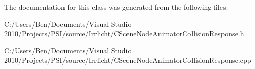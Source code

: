 The documentation for this class was generated from the following files\-:\begin{DoxyCompactItemize}
\item 
C\-:/\-Users/\-Ben/\-Documents/\-Visual Studio 2010/\-Projects/\-P\-S\-I/source/\-Irrlicht/C\-Scene\-Node\-Animator\-Collision\-Response.\-h\item 
C\-:/\-Users/\-Ben/\-Documents/\-Visual Studio 2010/\-Projects/\-P\-S\-I/source/\-Irrlicht/C\-Scene\-Node\-Animator\-Collision\-Response.\-cpp\end{DoxyCompactItemize}
